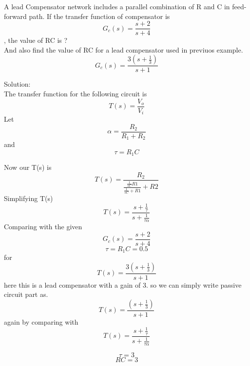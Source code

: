 \begin{enumerate}[label=\thesection.\arabic*.,ref=\thesection.\theenumi]

\begin{frame}
   A lead Compensator network includes a parallel combination of R and C in feed-forward path. If the transfer function of compensator  is $$G_c(s) = \frac{s+2}{s+4}$$, the value of RC is ?\\
   And also find the value of RC for a lead compensator used in previuos example. $$G_c(s) = \frac{3(s+\frac{1}{3})}{s+1}$$
\begin{center}
    
\end{center}
Solution:\\
The transfer function for the following circuit is
    $$
    T(s) = \frac{V_o}{V_i}
    $$
    Let
    $$
    \alpha = \frac{R_2}{R_1 + R_2}
    $$
    and 
    $$
    \tau = R_1C
    $$

Now our T(s) is 
    $$
    T(s) = \frac{R_2}{\frac{\frac{1}{sC}R1}{\frac{1}{sC}+R1} + R2}
    $$
    Simplifying T(s)
    $$
    T(s) = \frac{s+\frac{1}{\tau}}{s+\frac{1}{\tau\alpha}}
    $$
    Comparing with the given $$G_c(s) = \frac{s+2}{s+4}$$
    $$
    \tau = R_1C = 0.5
    $$
    for
    $$
    T(s) = \frac{3(s+\frac{1}{3})}{s+1}
    $$
    here this is a lead compensator with a gain of 3.
    so we can simply write passive circuit part as.
     $$
    T(s) = \frac{(s+\frac{1}{3})}{s+1}
    $$
    again by comparing with 
    $$
    T(s) = \frac{s+\frac{1}{\tau}}{s+\frac{1}{\tau\alpha}}
    $$
    
    $$\tau = 3$$
    $$RC = 3$$
\end{frame}

\end{enumerate}
